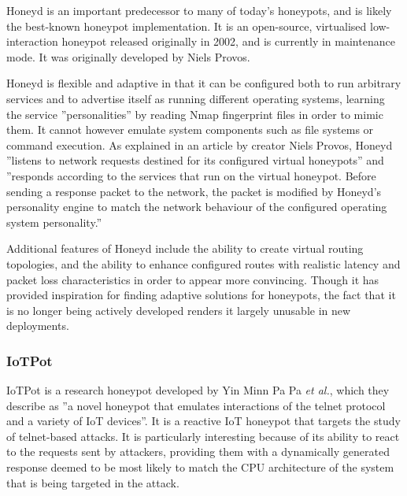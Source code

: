     Honeyd is an important predecessor to many of today's honeypots, and is likely the best-known honeypot implementation. It is an open-source, virtualised low-interaction honeypot released originally in 2002, and is currently in maintenance mode. It was originally developed by Niels Provos. 
    
     Honeyd is flexible and adaptive in that it can be configured both to run arbitrary services and to advertise itself as running different operating systems, learning the service ''personalities'' by reading Nmap fingerprint files in order to mimic them. \cite{HoneydWebsite} It cannot however emulate system components such as file systems or command execution. As explained in an article \cite{ProvosHoneyd} by creator Niels Provos, Honeyd ''listens to network requests destined for its configured virtual honeypots'' and ''responds according to the services that run on the virtual honeypot. Before sending a response packet to the network, the packet is modified by Honeyd's personality engine to match the network behaviour of the configured operating system personality.'' 

Additional features of Honeyd include the ability to create virtual routing topologies, and the ability to enhance configured routes with realistic latency and packet loss characteristics in order to appear more convincing. Though it has provided inspiration for finding adaptive solutions for honeypots, the fact that it is no longer being actively developed renders it largely unusable in new deployments.

\subsubsection{IoTPot} \label{AboutIoTPot}
	
	IoTPot is a research honeypot developed by Yin Minn Pa Pa \textit{et al.}, which they describe as ''a novel honeypot that emulates interactions of the telnet protocol and a variety of IoT devices''. \cite{IoTPot2016} It is a reactive IoT honeypot that targets the study of telnet-based attacks.  It is particularly interesting because of its ability to react to the requests sent by attackers, providing them with a dynamically generated response deemed to be most likely to match the CPU architecture of the system that is being targeted in the attack. 
    
